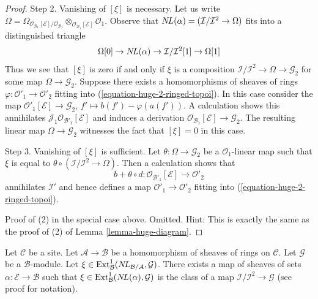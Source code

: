 \begin{proof}
\medskip\noindent
Step 2. Vanishing of $[\xi]$ is necessary. Let us write $\Omega =
\Omega_{\mathcal{O}_{\mathcal{B}_1}[\mathcal{E}]/\mathcal{O}_{\mathcal{B}_1}}
\otimes_{\mathcal{O}_{\mathcal{B}_1}[\mathcal{E}]} \mathcal{O}_1$.
Observe that $\mathop{N\!L}\nolimits(\alpha) = (\mathcal{I}/\mathcal{I}^2 \to \Omega)$
fits into a distinguished triangle
$$
\Omega[0] \to
\mathop{N\!L}\nolimits(\alpha) \to
\mathcal{I}/\mathcal{I}^2[1] \to
\Omega[1]
$$
Thus we see that $[\xi]$ is zero if and only if $\xi$
is a composition $\mathcal{I}/\mathcal{I}^2 \to \Omega \to \mathcal{G}_2$
for some map $\Omega \to \mathcal{G}_2$. Suppose there exists a
homomorphisms of sheaves of rings
$\varphi : \mathcal{O}'_1 \to \mathcal{O}'_2$ fitting into
(\ref{equation-huge-2-ringed-topoi}). In this case consider the map
$\mathcal{O}'_1[\mathcal{E}] \to \mathcal{G}_2$,
$f' \mapsto b(f') - \varphi(a(f'))$. A calculation
shows this annihilates $\mathcal{J}_1\mathcal{O}_{\mathcal{B}'_1}[\mathcal{E}]$
and induces a derivation
$\mathcal{O}_{\mathcal{B}_1}[\mathcal{E}] \to \mathcal{G}_2$.
The resulting linear map $\Omega \to \mathcal{G}_2$ witnesses the
fact that $[\xi] = 0$ in this case.

\medskip\noindent
Step 3. Vanishing of $[\xi]$ is sufficient. Let
$\theta : \Omega \to \mathcal{G}_2$ be a $\mathcal{O}_1$-linear map
such that $\xi$ is equal to
$\theta \circ (\mathcal{I}/\mathcal{I}^2 \to \Omega)$.
Then a calculation shows that
$$
b + \theta \circ d :
\mathcal{O}_{\mathcal{B}'_1}[\mathcal{E}]
\longrightarrow
\mathcal{O}'_2
$$
annihilates $\mathcal{I}'$ and hence defines a map
$\mathcal{O}'_1 \to \mathcal{O}'_2$ fitting into
(\ref{equation-huge-2-ringed-topoi}).

\medskip\noindent
Proof of (2) in the special case above. Omitted. Hint:
This is exactly the same as the proof of (2) of
Lemma \ref{lemma-huge-diagram}.
\end{proof}

\begin{lemma}
\label{lemma-NL-represent-ext-class-ringed-topoi}
Let $\mathcal{C}$ be a site. Let $\mathcal{A} \to \mathcal{B}$ be a
homomorphism of sheaves of rings on $\mathcal{C}$.
Let $\mathcal{G}$ be a $\mathcal{B}$-module.
Let
$\xi \in \mathop{\mathrm{Ext}}\nolimits^1_\mathcal{B}(\mathop{N\!L}\nolimits_{\mathcal{B}/\mathcal{A}}, \mathcal{G})$. 
There exists a map of sheaves of sets $\alpha : \mathcal{E} \to \mathcal{B}$
such that $\xi \in \mathop{\mathrm{Ext}}\nolimits^1_\mathcal{B}(\mathop{N\!L}\nolimits(\alpha), \mathcal{G})$
is the class of a map $\mathcal{I}/\mathcal{I}^2 \to \mathcal{G}$
(see proof for notation).
\end{lemma}

